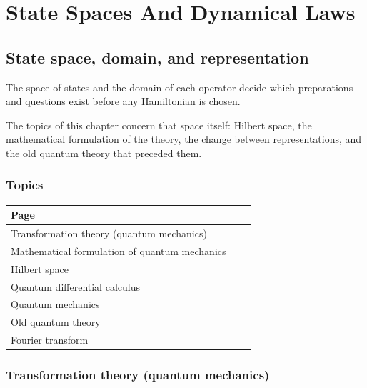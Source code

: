 \documentclass[11pt,oneside]{book}
\begin{document}
\part{State Spaces And Dynamical Laws}

\chapter{State space, domain, and representation}

\begin{claimbox}

The space of states and the domain of each operator decide which preparations and questions exist before any Hamiltonian is chosen.

\end{claimbox}

The topics of this chapter concern that space itself: Hilbert space, the mathematical formulation of the theory, the change between representations, and the old quantum theory that preceded them.

\section*{Topics}

\begin{longtable}{p{0.92\linewidth}}
\toprule
Page \\
\midrule
\endhead
{}\label{page:transformation-theory-quantum-mechanics}Transformation theory (quantum mechanics) \\
\label{page:mathematical-formulation-of-quantum-mechanics}Mathematical formulation of quantum mechanics \\
\label{page:hilbert-space}Hilbert space \\
\label{page:quantum-differential-calculus}Quantum differential calculus \\
\label{page:quantum-mechanics}Quantum mechanics \\
\label{page:old-quantum-theory}Old quantum theory \\
\label{page:fourier-transform}Fourier transform \\
\bottomrule
\end{longtable}

\clearpage

\section{Transformation theory (quantum mechanics)}
\end{document}
